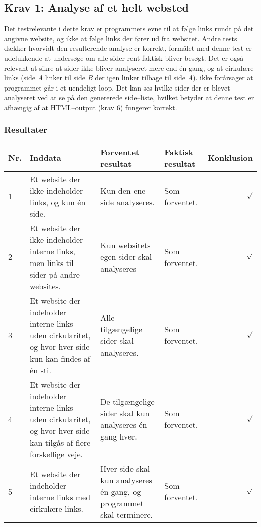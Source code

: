 \documentclass[a4paper,oneside,article]{memoir}
\begin{document}
\begin{landscape}
\section{Krav 1: Analyse af et helt websted}
Det testrelevante i dette krav er programmets evne til at følge links
rundt på det angivne website, og ikke at følge links der fører ud fra
websitet. Andre tests dækker hvorvidt den resulterende analyse er
korrekt, formålet med denne test er udelukkende at undersøge om alle
sider rent faktisk bliver besøgt. Det er også relevant at sikre at
sider ikke bliver analyseret mere end én gang, og at cirkulære links
(side \textit{A} linker til side \textit{B} der igen linker tilbage
til side \textit{A}). ikke forårsager at programmet går i et uendeligt
loop. Det kan ses hvilke sider der er blevet analyseret ved at se på
den genererede side--liste, hvilket betyder at denne test er afhængig
af at HTML--output (krav 6) fungerer korrekt.

\subsubsection{Resultater}
\begin{longtable}[c]{p{20pt}|p{220pt}|p{130pt}|p{130pt}|r}
\textbf{Nr.} &
\textbf{Inddata} &
\textbf{Forventet resultat} &
\textbf{Faktisk resultat} &
\textbf{Konklusion} \\ \hline

1 &
Et website der ikke indeholder links, og kun én side. &
Kun den ene side analyseres. &
Som forventet. &
$\surd$ \\ \hline

2 &
Et website der ikke indeholder interne links, men links til
sider på andre websites. &
Kun websitets egen sider skal analyseres &
Som forventet. &
$\surd$ \\ \hline

3 &
Et website der indeholder interne links uden cirkularitet, og
hvor hver side kun kan findes af én sti. &
Alle tilgængelige sider skal analyseres. &
Som forventet. &
$\surd$ \\ \hline

4 &
Et website der indeholder interne links uden cirkularitet, og hvor
hver side kan tilgås af flere forskellige veje. &
De tilgængelige sider skal kun analyseres én gang hver. &
Som forventet. &
$\surd$ \\ \hline

5 &
Et website der indeholder interne links med cirkulære links. &
Hver side skal kun analyseres én gang, og programmet skal
terminere. &
Som forventet. &
$\surd$


\end{longtable}
\end{landscape}
\end{document}
